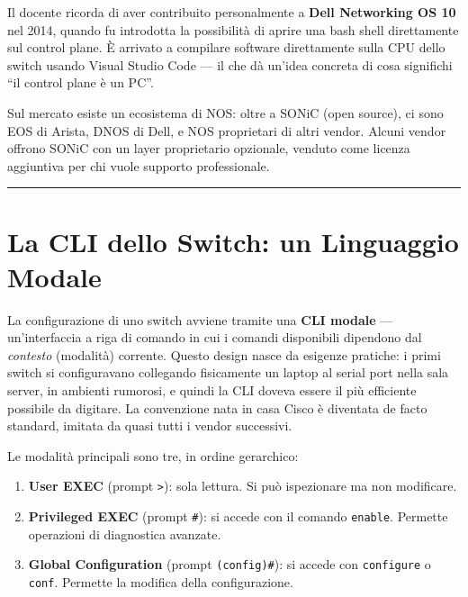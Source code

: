 \documentclass[
  italian,
  openany]{book}
\providecommand{\tightlist}{%
  \setlength{\itemsep}{0pt}\setlength{\parskip}{0pt}}
\begin{document}
Il docente ricorda di aver contribuito personalmente a \textbf{Dell
Networking OS 10} nel 2014, quando fu introdotta la possibilità di
aprire una bash shell direttamente sul control plane. È arrivato a
compilare software direttamente sulla CPU dello switch usando Visual
Studio Code --- il che dà un'idea concreta di cosa significhi ``il
control plane è un PC''.

Sul mercato esiste un ecosistema di NOS: oltre a SONiC (open source), ci
sono EOS di Arista, DNOS di Dell, e NOS proprietari di altri vendor.
Alcuni vendor offrono SONiC con un layer proprietario opzionale, venduto
come licenza aggiuntiva per chi vuole supporto professionale.

\begin{center}\rule{0.5\linewidth}{0.5pt}\end{center}

\section{La CLI dello Switch: un Linguaggio
Modale}\label{la-cli-dello-switch-un-linguaggio-modale}

La configurazione di uno switch avviene tramite una \textbf{CLI modale}
--- un'interfaccia a riga di comando in cui i comandi disponibili
dipendono dal \emph{contesto} (modalità) corrente. Questo design nasce
da esigenze pratiche: i primi switch si configuravano collegando
fisicamente un laptop al serial port nella sala server, in ambienti
rumorosi, e quindi la CLI doveva essere il più efficiente possibile da
digitare. La convenzione nata in casa Cisco è diventata de facto
standard, imitata da quasi tutti i vendor successivi.

Le modalità principali sono tre, in ordine gerarchico:

\begin{enumerate}
\def\labelenumi{\arabic{enumi}.}
\tightlist
\item
  \textbf{User EXEC} (prompt \texttt{\textgreater{}}): sola lettura. Si
  può ispezionare ma non modificare.
\item
  \textbf{Privileged EXEC} (prompt \texttt{\#}): si accede con il
  comando \texttt{enable}. Permette operazioni di diagnostica avanzate.
\item
  \textbf{Global Configuration} (prompt \texttt{(config)\#}): si accede
  con \texttt{configure} o \texttt{conf}. Permette la modifica della
  configurazione.
\end{enumerate}
\end{document}
